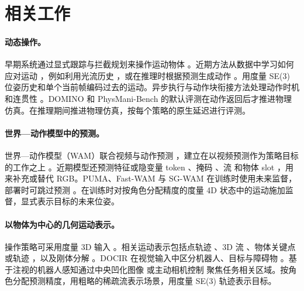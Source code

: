 \section{相关工作}
\label{sec:related_work}

\paragraph{动态操作。}早期系统通过显式跟踪与拦截规划来操作运动物体 \cite{allen1993,baeuml2010,marturi2019dynamic}。近期方法从数据中学习如何应对运动 \cite{dynawm,dynamicmanip,dynamicvla}，例如利用光流历史 \cite{domino,dynamicwam}，或在推理时根据预测生成动作 \cite{foretime,ahead,physmani}。\ours 用度量 SE(3) 位姿历史和单个当前帧编码过去的运动。异步执行与动作块衔接方法处理动作时机和连贯性 \cite{bid,rtc,smolvla,vlash,dynamicvla}。DOMINO \cite{domino} 和 PhysMani-Bench \cite{physmani} 的默认评测在动作返回后才推进物理仿真。\bench 在推理期间推进物理仿真，按每个策略的原生延迟进行评测。

\paragraph{世界—动作模型中的预测。}世界—动作模型（WAM）联合视频与动作预测 \cite{uwm,uva,dreamzero,openwam_alpha}，建立在以视频预测作为策略目标的工作之上 \cite{gr1,seer}。近期模型还预测特征或隐变量 token \cite{flare,dreamvla,wog}、掩码 \cite{maskwam}、流 \cite{dreamwam} 和物体 slot \cite{oawam}，用来补充或替代 RGB。PUMA、Fast-WAM 与 SG-WAM 在训练时使用未来监督，部署时可跳过预测 \cite{domino,fastwam,sgwam}。\ours 在训练时对按角色分配精度的度量 4D 状态中的运动施加监督，显式表示目标的未来位姿。

\paragraph{以物体为中心的几何运动表示。}操作策略可采用度量 3D 输入 \cite{peract,dp3}。相关运动表示包括点轨迹 \cite{atm,track2act,im2flow2act}、3D 流 \cite{generalflow,flowdreamer,pointworld,physmani}、物体关键点或轨迹 \cite{kpam,spot,objectforesight}，以及刚体分解 \cite{se3nets,se3posenets}。DOCIR 在视觉输入中区分机器人、目标与障碍物 \cite{docir}。基于注视的机器人感知通过中央凹化图像 \cite{kim2021gaze,chuang2026lookfocusact} 或主动相机控制 \cite{kerr2025eyerobot} 聚焦任务相关区域。\ours 按角色分配预测精度，用粗略的稀疏流表示场景，用度量 SE(3) 轨迹表示目标。
